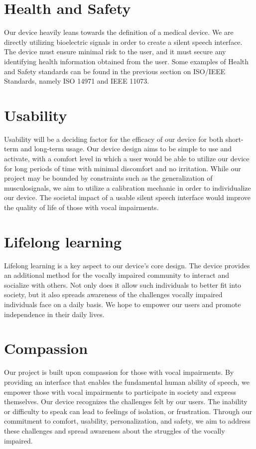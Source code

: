 \section{Health and Safety}
Our device heavily leans towards the definition of a medical device. We are directly utilizing bioelectric signals
 in order to create a silent speech interface. The device must ensure minimal risk to the user, and it must secure any
 identifying health information obtained from the user. Some examples of Health and Safety standards can be found in the previous
 section on ISO/IEEE Standards, namely ISO 14971 and IEEE 11073.

\section{Usability} 
Usability will be a deciding factor for the efficacy of our device for both short-term and long-term usage. Our device design aims to be simple to use and activate,
 with a comfort level in which a user would be able to utilize our device for long periods of time with minimal discomfort and no irritation. While our project may be bounded by constraints such
 as the generalization of musculosignals, we aim to utilize a calibration mechanic in order to individualize our device. The societal impact of a usable silent speech interface would
 improve the quality of life of those with vocal impairments.

\section{Lifelong learning}
Lifelong learning is a key aspect to our device's core design. The device provides an additional method for the vocally impaired community to interact and socialize with others.
 Not only does it allow such individuals to better fit into society, but it also spreads awareness of the challenges vocally impaired individuals face on a daily basis. We hope to
 empower our users and promote independence in their daily lives.

\section{Compassion}
Our project is built upon compassion for those with vocal impairments. By providing an interface that enables the fundamental human
 ability of speech, we empower those with vocal impairments to participate in society and express themselves. Our device recognizes
 the challenges felt by our users. The inability or difficulty to speak can lead to feelings of isolation, or frustration. Through
 our commitment to comfort, usability, personalization, and safety, we aim to address these challenges and spread awareness about
 the struggles of the vocally impaired.